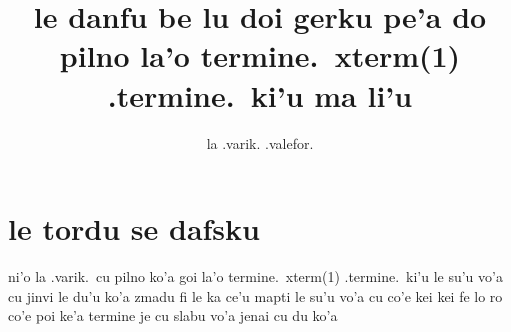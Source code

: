 \documentclass{article}
\title{le danfu be lu doi gerku pe'a do pilno la'o termine.\ xterm(1) .termine.\ ki'u ma li'u}
\author{la .varik. .valefor.}
\begin{document}
\maketitle

\section{le tordu se dafsku}
ni'o la .varik.\ cu pilno ko'a goi la'o termine.\ xterm(1) .termine.\ ki'u le su'u vo'a cu jinvi le du'u ko'a zmadu fi le ka ce'u mapti le su'u vo'a cu co'e kei kei fe lo ro co'e poi ke'a termine je cu slabu vo'a jenai cu du ko'a
\end{document}
